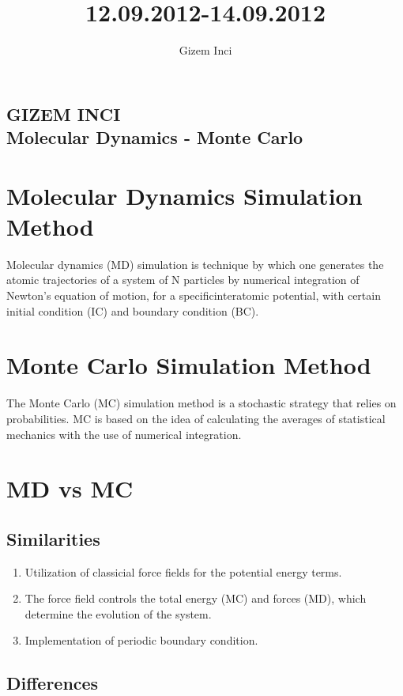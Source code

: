 \documentclass[a4paper,10pt]{paper}
\title{12.09.2012-14.09.2012}
\author{Gizem Inci}
\begin{document}
\begin{center}
        \section*{\textbf {GIZEM INCI\\
                Molecular Dynamics - Monte Carlo}}
\end{center}

 \section*{Molecular Dynamics Simulation Method}
Molecular dynamics (MD) simulation is technique by which one generates the atomic trajectories of a system of N particles
by numerical integration of Newton’s equation of motion, for a specificinteratomic potential, with certain initial condition 
(IC) and boundary condition (BC).

 \section*{Monte Carlo Simulation Method}
The Monte Carlo (MC) simulation method is a stochastic strategy that relies on probabilities. MC is based on the idea of calculating
the averages of statistical mechanics with the use of numerical integration.

 \section*{MD vs MC}

 \subsection*{Similarities}

\begin{enumerate}
	\item Utilization of classicial force fields for the potential energy terms.
	\item The force field controls the total energy (MC) and forces (MD), which determine the evolution of the system.
	\item Implementation of periodic boundary condition.
\end{enumerate}

 \subsection*{Differences}
\end{document}
